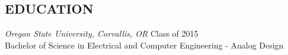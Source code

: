 \documentclass[line,margin]{res}
\begin{document}
\begin{resume}


\section{EDUCATION}
\vspace{25px}
\begin{adjustwidth}{-115pt}{0pt}
	{\sl Oregon State University, Corvallis, OR}
		\hfill Class of 2015 \\
			Bachelor of Science in Electrical and Computer Engineering - Analog Design
\end{adjustwidth}

\end{resume}
\end{document}
